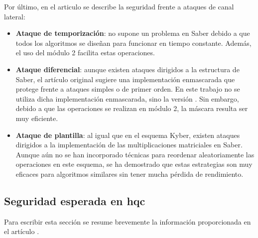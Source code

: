 Por último, en el articulo se describe la seguridad frente a ataques de canal lateral:
\begin{itemize}
	\item \textbf{Ataque de temporización}: no supone un problema en Saber debido a que todos los algoritmos se diseñan para funcionar en tiempo constante. Además, el uso del módulo 2 facilita estas operaciones.
	\item \textbf{Ataque diferencial}: aunque existen ataques dirigidos a la estructura de Saber, el artículo original sugiere una implementación enmascarada que protege frente a ataques simples o de primer orden. En este trabajo no se utiliza dicha implementación enmascarada, sino la versión . Sin embargo, debido a que las operaciones se realizan en módulo 2, la máscara resulta ser muy eficiente.
	\item \textbf{Ataque de plantilla}: al igual que en el esquema Kyber, existen ataques dirigidos a la implementación de las multiplicaciones matriciales en Saber. Aunque aún no se han incorporado técnicas para reordenar aleatoriamente las operaciones en este esquema, se ha demostrado que estas estrategias son muy eficaces para algoritmos similares sin tener mucha pérdida de rendimiento.
\end{itemize}


\subsection{Seguridad esperada en \acrshort{hqc}}
Para escribir esta sección se resume brevemente la información proporcionada en el artículo \cite{hqc2025}.
\newline

